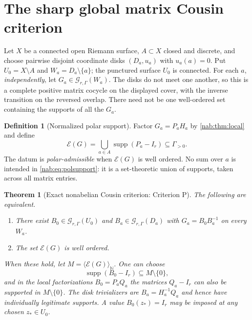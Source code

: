 \documentclass[11pt,letterpaper]{article}
\newtheorem{theorem}{Theorem}[section]
\theoremstyle{definition}
\newtheorem{definition}[definition]{Definition}
\theoremstyle{remark}
\newcommand{\N}{\mathbb N}
\newcommand{\GG}{\mathscr G_{r,\Gamma}}
\newcommand{\supp}{\operatorname{supp}}
\newcommand{\EU}{\mathcal E}
\newcommand{\angles}[1]{\langle #1\rangle_{\N}}
\numberwithin{equation}{section}
\begin{document}
\section{The sharp global matrix Cousin criterion}\label{nab:sec:cousin}

Let $X$ be a connected open Riemann surface, $A\subset X$ closed and discrete,
and choose pairwise disjoint coordinate disks $(D_a,u_a)$ with $u_a(a)=0$. Put
$U_0=X\setminus A$ and $W_a=D_a\setminus\{a\}$; the punctured surface $U_0$ is
connected. For each $a$, \emph{independently}, let $G_a\in\GG(W_a)$. The disks
do not meet one another, so this is a complete positive matrix cocycle on the
displayed cover, with the inverse transition on the reversed overlap. There
need not be one well-ordered set containing the supports of all the $G_a$.

\begin{definition}[Normalized polar support]\label{nab:def:polsupport}
Factor $G_a=P_aH_a$ by \cref{nab:thm:local} and define
\begin{equation}\label{nab:eq:polsupport}
 \EU(G)=\bigcup_{a\in A}\supp(P_a-I_r)\subseteq\Gamma_{>0}.
\end{equation}
The datum is \emph{polar-admissible} when $\EU(G)$ is well ordered. No sum
over $a$ is intended in \eqref{nab:eq:polsupport}: it is a set-theoretic union
of supports, taken across all matrix entries.
\end{definition}

\begin{theorem}[Exact nonabelian Cousin criterion: Criterion P]
\label{nab:thm:criterion}
The following are equivalent.
\begin{enumerate}[label=\textup{(\roman*)}]
\item There exist $B_0\in\GG(U_0)$ and $B_a\in\GG(D_a)$ with
$G_a=B_0B_a^{-1}$ on every $W_a$.
\item The set $\EU(G)$ is well ordered.
\end{enumerate}
When these hold, let $M=\angles{\EU(G)}$. One can choose
\begin{equation}\label{nab:eq:centralsupport}
 \supp(B_0-I_r)\subseteq M\setminus\{0\},
\end{equation}
and in the local factorizations $B_0=P_aQ_a$ the matrices $Q_a-I_r$ can also
be supported in $M\setminus\{0\}$. The disk trivializers are
$B_a=H_a^{-1}Q_a$ and hence have individually legitimate supports. A value
$B_0(z_*)=I_r$ may be imposed at any chosen $z_*\in U_0$.
\end{theorem}
\end{document}
